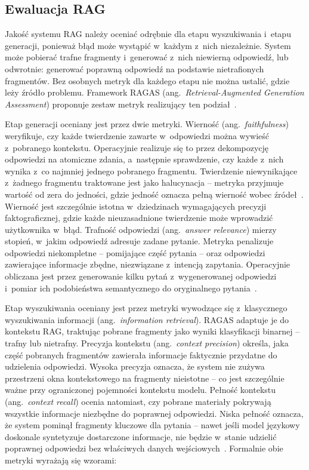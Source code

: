 \subsection{Ewaluacja RAG}\label{subsec:ewaluacja-rag}

Jakość systemu RAG należy oceniać odrębnie dla etapu wyszukiwania i~etapu
generacji, ponieważ błąd może wystąpić w~każdym z~nich niezależnie. System może
pobierać trafne fragmenty i~generować z~nich niewierną odpowiedź, lub
odwrotnie: generować poprawną odpowiedź na podstawie nietrafionych fragmentów.
Bez osobnych metryk dla każdego etapu nie można ustalić, gdzie leży źródło
problemu. Framework RAGAS (ang.~\textit{Retrieval-Augmented Generation
  Assessment}) proponuje zestaw metryk realizujący ten
podział~\cite{es2024ragas}.

Etap generacji oceniany jest przez dwie metryki. Wierność
(ang.~\textit{faithfulness}) weryfikuje, czy każde twierdzenie zawarte
w~odpowiedzi można wywieść z~pobranego kontekstu. Operacyjnie realizuje się to
przez dekompozycję odpowiedzi na atomiczne zdania, a~następnie sprawdzenie, czy
każde z~nich wynika z~co najmniej jednego pobranego fragmentu. Twierdzenie
niewynikające z~żadnego fragmentu traktowane jest jako halucynacja -- metryka
przyjmuje wartość od zera do jedności, gdzie jedność oznacza pełną wierność
wobec źródeł~\cite{es2024ragas}. Wierność jest szczególnie istotna
w~dziedzinach wymagających precyzji faktograficznej, gdzie każde nieuzasadnione
twierdzenie może wprowadzić użytkownika w~błąd. Trafność odpowiedzi
(ang.~\textit{answer relevance}) mierzy stopień, w~jakim odpowiedź adresuje
zadane pytanie. Metryka penalizuje odpowiedzi niekompletne -- pomijające część
pytania -- oraz odpowiedzi zawierające informacje zbędne, niezwiązane
z~intencją zapytania. Operacyjnie obliczana jest przez generowanie kilku pytań
z~wygenerowanej odpowiedzi i~pomiar ich podobieństwa semantycznego do
oryginalnego pytania~\cite{es2024ragas}.

Etap wyszukiwania oceniany jest przez metryki wywodzące się z~klasycznego
wyszukiwania informacji (ang.~\textit{information retrieval}). RAGAS adaptuje
je do kontekstu RAG, traktując pobrane fragmenty jako wyniki klasyfikacji
binarnej -- trafny lub nietrafny. Precyzja kontekstu (ang.~\textit{context
  precision}) określa, jaka część pobranych fragmentów zawierała informacje
faktycznie przydatne do udzielenia odpowiedzi. Wysoka precyzja oznacza, że
system nie zużywa przestrzeni okna kontekstowego na fragmenty nieistotne -- co
jest szczególnie ważne przy ograniczonej pojemności kontekstu modelu. Pełność
kontekstu (ang.~\textit{context recall}) ocenia natomiast, czy pobrane
materiały pokrywają wszystkie informacje niezbędne do poprawnej odpowiedzi.
Niska pełność oznacza, że system pominął fragmenty kluczowe dla pytania --
nawet jeśli model językowy doskonale syntetyzuje dostarczone informacje, nie
będzie w~stanie udzielić poprawnej odpowiedzi bez właściwych danych
wejściowych~\cite{es2024ragas}. Formalnie obie metryki wyrażają się wzorami:

